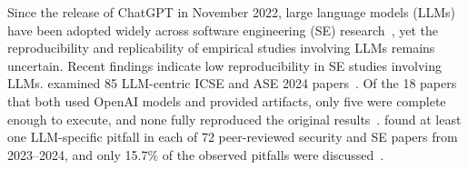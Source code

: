 Since the release of ChatGPT in November 2022, large language models (LLMs) have been adopted widely across software engineering (SE) research~\cite{DBLP:journals/tosem/HouZLYWLLLGW24}, yet the reproducibility and replicability of empirical studies involving LLMs remains uncertain.
Recent findings indicate low reproducibility in SE studies involving LLMs.
\citeauthor{DBLP:journals/corr/abs-2510-25506} examined 85 LLM-centric ICSE and ASE 2024 papers~\cite{DBLP:journals/corr/abs-2510-25506}.
Of the 18 papers that both used OpenAI models and provided artifacts, only five were complete enough to execute, and none fully reproduced the original results~\cite{DBLP:journals/corr/abs-2510-25506}.
\citeauthor{DBLP:conf/ndss/EvertzRNMNSGPSS26} found at least one LLM-specific pitfall in each of 72 peer-reviewed security and SE papers from 2023--2024, and only 15.7\% of the observed pitfalls were discussed~\cite{DBLP:conf/ndss/EvertzRNMNSGPSS26}.

